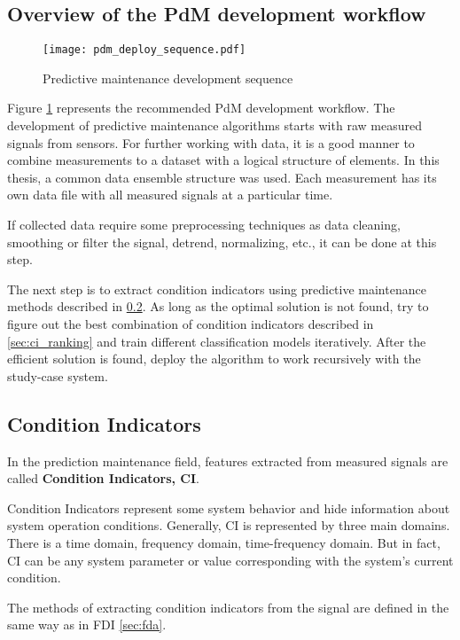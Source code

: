 \subsection{Overview of the PdM development workflow}

\begin{figure}[h!]
    \centering
    \texttt{[image: pdm\_deploy\_sequence.pdf]}
    \caption{Predictive maintenance development sequence}
    \label{fig:pdm_dev_seq}
\end{figure}


Figure \ref{fig:pdm_dev_seq} represents the recommended PdM development
workflow.  The development of predictive maintenance algorithms starts with
raw measured signals from sensors. For further working with data, it is a
good manner to combine measurements to a dataset with a logical structure
of elements. In this thesis, a common data ensemble structure was used.
Each measurement has its own data file with all measured signals at a
particular time. 


If collected data require some preprocessing techniques as data cleaning,
smoothing or filter the signal, detrend, normalizing, etc., it can be done
at this step. 

The next step is to extract condition indicators using predictive
maintenance methods described in \ref{sec:ci}. As long as the optimal
solution is not found, try to figure out the best combination of condition
indicators described in \ref{sec:ci_ranking} and train different
classification models iteratively.  After the efficient solution is found,
deploy the algorithm to work recursively with the study-case system.


\subsection{Condition Indicators}\label{sec:ci}
In the prediction maintenance field, features extracted from measured
signals are called \textbf{Condition Indicators, CI}. 

Condition Indicators
represent some system behavior and hide information about system operation
conditions.  Generally, CI is represented by three main domains. There is a
time domain, frequency domain, time-frequency domain. But in fact, CI can
be any system parameter or value corresponding with the system's current
condition.

The methods of extracting condition indicators from the signal are defined
in the same way as in FDI \ref{sec:fda}. 

